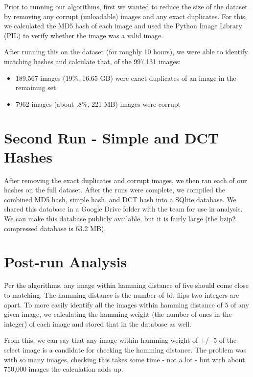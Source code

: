 \documentclass[11pt,a4paper,titlepage]{article}
\begin{document}
Prior to running our algorithms, first we wanted to reduce the size of the
dataset by removing any corrupt (unloadable) images and any exact duplicates.
For this, we calculated the MD5 hash of each image and used the Python Image
Library (PIL) to verify whether the image was a valid image.

After running this on the dataset (for roughly 10 hours), we were able to
identify matching hashes and calculate that, of the 997,131 images:

\begin{itemize}
    \item
        189,567 images (19\%, 16.65 GB)  were exact duplicates of an image in the remaining set
    \item
        7962 images (about .8\%, 221 MB) images were corrupt
\end{itemize}


\section{Second Run - Simple and DCT Hashes}

After removing the exact duplicates and corrupt images, we then ran each of our
hashes on the full dataset.  After the runs were complete, we compiled the
combined MD5 hash, simple hash, and DCT hash into a SQlite database.  We shared
this database in a Google Drive folder with the team for use in analysis.  We
can make this database publicly available, but it is fairly large (the bzip2
compressed database is 63.2 MB).

\section{Post-run Analysis}

Per the algorithms, any image within hamming distance of five should come close
to matching.  The hamming distance is the number of bit flips two integers are
apart.  To more easily identify all the images within hamming distance of 5 of
any given image, we calculating the hamming weight (the number of ones in the
integer) of each image and stored that in the database as well.

From this, we can say that any image within hamming weight of +/- 5 of the
select image is a candidate for checking the hamming distance.  The problem was
with so many images, checking this takes some time - not a lot - but with about
750,000 images the calculation adds up.
\end{document}
